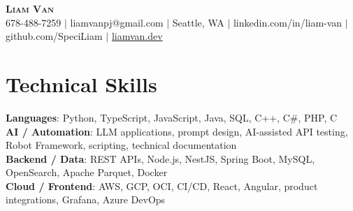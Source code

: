 \documentclass[letterpaper,11pt]{article}
\begin{document}

%
\begin{center}
    \textbf{\Huge \scshape Liam Van} \\ \vspace{1pt}
    \small 678-488-7259 $|$ \small {liamvanpj@gmail.com} $|$ Seattle, WA
 {{$|$ linkedin.com/in/liam-van} {$|$ github.com/SpeciLiam} {$|$ \href{https://liamvan.dev}{liamvan.dev}}}

\end{center}

\section{Technical Skills}
 \begin{itemize}[leftmargin=0.15in, label={}]
    \small{\item{
     \textbf{Languages}{: Python, TypeScript, JavaScript, Java, SQL, C++, C\#, PHP, C} \\
     \textbf{AI / Automation}{: LLM applications, prompt design, AI-assisted API testing, Robot Framework, scripting, technical documentation} \\
     \textbf{Backend / Data}{: REST APIs, Node.js, NestJS, Spring Boot, MySQL, OpenSearch, Apache Parquet, Docker} \\
     \textbf{Cloud / Frontend}{: AWS, GCP, OCI, CI/CD, React, Angular, product integrations, Grafana, Azure DevOps} \\
    }}
 \end{itemize}
%

\end{document}
